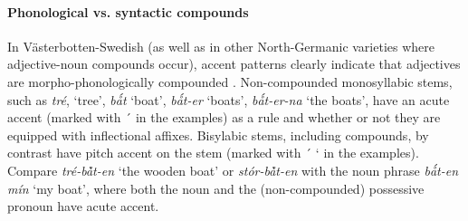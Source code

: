 \paragraph{Phonological vs. syntactic compounds} In Västerbotten-Swedish (as well as in other North-Germanic varieties where adjective-noun compounds occur), accent patterns clearly indicate that adjectives are morpho-phonologically compounded \citep[cf.][]{dahl2003}. Non-compounded monosyllabic stems, such as \textit{tré}, ‘tree’, \textit{bǻt} ‘boat’, \textit{bǻt-er} ‘boats’, \textit{bǻt-er-na} ‘the boats’, have an acute accent (marked with ´ in the examples) as a rule and whether or not they are equipped with inflectional affixes. Bisylabic stems, including compounds, by contrast have pitch accent on the stem (marked with ´ ` in the examples). Compare \textit{tré-bå̀t-en} ‘the wooden boat’ or \textit{stór-bå̀t-en} with the noun phrase \textit{bǻt-en mín} ‘my boat’, where both the noun and the (non-compounded) possessive pronoun have acute accent.

